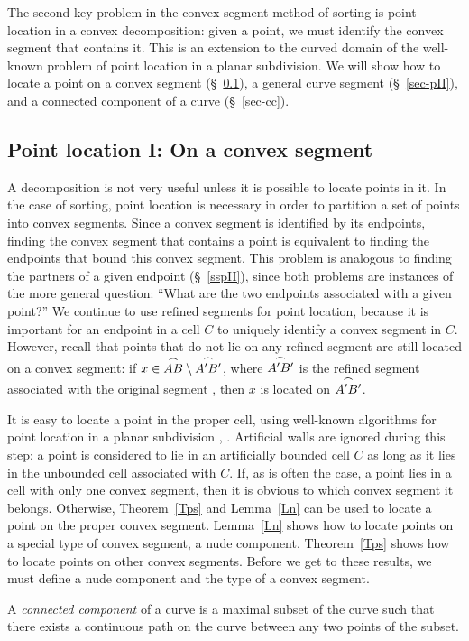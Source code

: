 The second key problem in the convex segment method of sorting is
point location in a convex decomposition: given a point, we must identify
the convex segment that contains it.
This is an extension to the curved domain of the well-known problem 
of point 
location in a planar subdivision. 
We will show how to locate a point on a convex segment (\S~\ref{sec-pI}), 
a general curve segment (\S~\ref{sec-pII}), and a connected component of 
a curve
(\S~\ref{sec-cc}).

\subsection{Point location I: On a convex segment}
\label{sec-pI}

A decomposition is not very useful unless it is possible to locate points 
in it. 
In the case of sorting, point location is necessary in order to partition 
a set of points
into convex segments.
Since a convex segment is identified by its endpoints, finding the convex 
segment that contains a point is equivalent to finding the endpoints 
that bound 
this convex segment.
This problem is analogous to finding the partners of a given
endpoint (\S~\ref{sspII}), since both problems are 
instances of the more general question: ``What are the two 
endpoints associated 
with a given point?''
We continue to use refined segments for point location, 
because it is important for 
an endpoint in a cell $C$ to uniquely identify a convex segment in $C$.
However, recall that points that do not lie on any refined segment 
are still located
on a convex segment: if $x \in \mbox{$\stackrel{\frown}{AB}$} \setminus \mbox{$\stackrel{\frown}{A'B'}$}$, where 
$\mbox{$\stackrel{\frown}{A'B'}$}$ 
is the refined segment associated with the original segment , 
then $x$ is located on $\mbox{$\stackrel{\frown}{A'B'}$}$.

It is easy to locate a point in the proper cell, using well-known 
algorithms 
for point location in a planar subdivision \cite{kirk}, \cite{PS}.
Artificial walls are ignored during this step: a point
is considered to lie in an artificially bounded cell $C$ as long as it lies
in the unbounded cell associated with $C$.
If, as is often the case, a point lies in a cell with only one 
convex segment, 
then it is obvious to which convex segment it belongs.
Otherwise, Theorem~\ref{Tps} and Lemma~\ref{Ln} can be used 
to locate a point on the proper convex segment.
Lemma~\ref{Ln} shows how to locate points on a special type of convex 
segment,
a nude component.
Theorem~\ref{Tps} shows how to locate points on other convex segments.
Before we get to these results, we must define a nude component and the 
type of
a convex segment.
%
\begin{definition}
A {\em connected component} of a curve is a maximal subset of the 
curve such that 
there exists a continuous path on the curve between any two points of 
the subset.
\end{definition}


